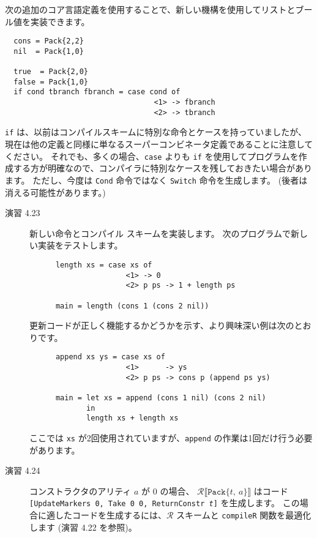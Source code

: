 \documentclass{jarticle}
\begin{document}
次の追加のコア言語定義を使用することで、新しい機構を使用してリストとブール値を実装できます。

\begin{verbatim}
  cons = Pack{2,2}
  nil  = Pack{1,0}

  true  = Pack{2,0}
  false = Pack{1,0}
  if cond tbranch fbranch = case cond of
                                  <1> -> fbranch
                                  <2> -> tbranch
\end{verbatim}

\texttt{if} は、以前はコンパイルスキームに特別な命令とケースを持っていましたが、現在は他の定義と同様に単なるスーパーコンビネータ定義であることに注意してください。
それでも、多くの場合、\texttt{case} よりも \texttt{if} を使用してプログラムを作成する方が明確なので、コンパイラに特別なケースを残しておきたい場合があります。
ただし、今度は \texttt{Cond} 命令ではなく \texttt{Switch} 命令を生成します。
(後者は消える可能性があります。)

\begin{description}
	\item[演習 4.23] 新しい命令とコンパイル スキームを実装します。
		次のプログラムで新しい実装をテストします。
		\begin{verbatim}
      length xs = case xs of
                      <1> -> 0
                      <2> p ps -> 1 + length ps

      main = length (cons 1 (cons 2 nil))
    \end{verbatim}
		更新コードが正しく機能するかどうかを示す、より興味深い例は次のとおりです。
		\begin{verbatim}
      append xs ys = case xs of
                      <1>      -> ys
                      <2> p ps -> cons p (append ps ys)

      main = let xs = append (cons 1 nil) (cons 2 nil)
             in
             length xs + length xs
    \end{verbatim}
		ここでは \texttt{xs} が2回使用されていますが、\texttt{append} の作業は1回だけ行う必要があります。

	\item[演習 4.24] コンストラクタのアリティ $a$ が 0 の場合、
		$\mathcal{R} \llbracket \texttt{Pack\{} t, ~ a \texttt{\}} \rrbracket$ はコード \texttt{[UpdateMarkers 0, Take 0 0, ReturnConstr \textit{t}]} を生成します。
		この場合に適したコードを生成するには、$\mathcal{R}$ スキームと \texttt{compileR} 関数を最適化します (演習 4.22 を参照)。
\end{description}
\end{document}
